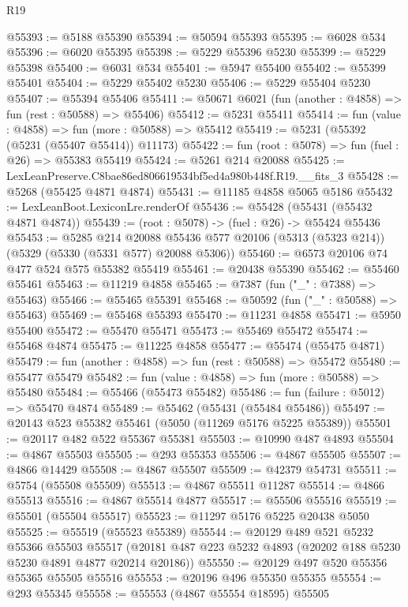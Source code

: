 \begin{lexlean}{R19}
\begin{coremodule}
@55393 := @5188 @55390
@55394 := @50594 @55393
@55395 := @6028 @534
@55396 := @6020 @55395
@55398 := @5229 @55396 @5230
@55399 := @5229 @55398
@55400 := @6031 @534
@55401 := @5947 @55400
@55402 := @55399 @55401
@55404 := @5229 @55402 @5230
@55406 := @5229 @55404 @5230
@55407 := @55394 @55406
@55411 := @50671 @6021 (fun (another : @4858) => fun (rest : @50588) => @55406)
@55412 := @5231 @55411
@55414 := fun (value : @4858) => fun (more : @50588) => @55412
@55419 := @5231 (@55392 (@5231 (@55407 @55414)) @11173)
@55422 := fun (root : @5078) => fun (fuel : @26) => @55383 @55419
@55424 := @5261 @214 @20088
@55425 := LexLeanPreserve.C8bae86ed806619534bf5ed4a980b448f.R19.__fits_3
@55428 := @5268 (@55425 @4871 @4874)
@55431 := @11185 @4858 @5065 @5186
@55432 := LexLeanBoot.LexiconLre.renderOf
@55436 := @55428 (@55431 (@55432 @4871 @4874))
@55439 := (root : @5078) -> (fuel : @26) -> @55424 @55436
@55453 := @5285
    @214
    @20088
    @55436
    @577
    @20106
    (@5313 (@5323 @214))
    (@5329 (@5330 (@5331 @577) @20088 @5306))
@55460 := @6573 @20106 @74 @477 @524 @575 @55382 @55419
@55461 := @20438 @55390
@55462 := @55460 @55461
@55463 := @11219 @4858
@55465 := @7387 (fun ("_" : @7388) => @55463)
@55466 := @55465 @55391
@55468 := @50592 (fun ("_" : @50588) => @55463)
@55469 := @55468 @55393
@55470 := @11231 @4858
@55471 := @5950 @55400
@55472 := @55470 @55471
@55473 := @55469 @55472
@55474 := @55468 @4874
@55475 := @11225 @4858
@55477 := @55474 (@55475 @4871)
@55479 := fun (another : @4858) => fun (rest : @50588) => @55472
@55480 := @55477 @55479
@55482 := fun (value : @4858) => fun (more : @50588) => @55480
@55484 := @55466 (@55473 @55482)
@55486 := fun (failure : @5012) => @55470 @4874
@55489 := @55462 (@55431 (@55484 @55486))
@55497 := @20143 @523 @55382 @55461 (@5050 (@11269 @5176 @5225 @55389))
@55501 := @20117 @482 @522 @55367 @55381
@55503 := @10990 @487 @4893
@55504 := @4867 @55503
@55505 := @293 @55353
@55506 := @4867 @55505
@55507 := @4866 @14429
@55508 := @4867 @55507
@55509 := @42379 @54731
@55511 := @5754 (@55508 @55509)
@55513 := @4867 @55511 @11287
@55514 := @4866 @55513
@55516 := @4867 @55514 @4877
@55517 := @55506 @55516
@55519 := @55501 (@55504 @55517)
@55523 := @11297 @5176 @5225 @20438 @5050
@55525 := @55519 (@55523 @55389)
@55544 := @20129
    @489
    @521
    @5232
    @55366
    @55503
    @55517
    (@20181 @487 @223 @5232 @4893 (@20202 @188 @5230 @5230 @4891 @4877 @20214 @20186))
@55550 := @20129 @497 @520 @55356 @55365 @55505 @55516
@55553 := @20196 @496 @55350 @55355
@55554 := @293 @55345
@55558 := @55553 (@4867 @55554 @18595) @55505

\end{coremodule}
\end{lexlean}

